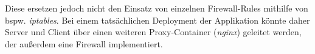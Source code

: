 Diese ersetzen jedoch nicht den Einsatz von einzelnen Firewall-Rules mithilfe von \ac{bspw.} \textit{iptables}.
Bei einem tatsächlichen Deployment der Applikation könnte daher Server und Client über einen weiteren Proxy-Container (\textit{nginx}) geleitet werden, der außerdem eine Firewall implementiert.
\par
\clearpage
